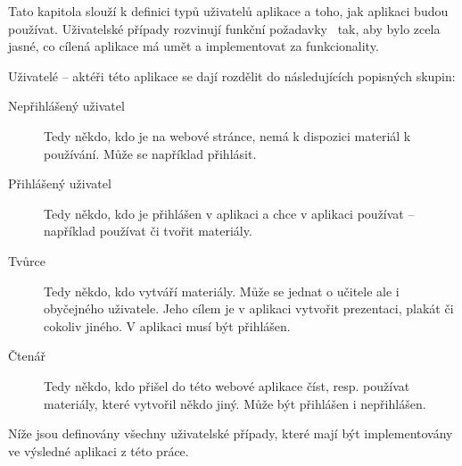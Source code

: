 Tato kapitola slouží k definici typů uživatelů aplikace a toho, jak aplikaci budou používat.
Uživatelské případy rozvinují funkční požadavky~\cite{uml_2007} tak, aby bylo zcela jasné, co cílená aplikace má umět a implementovat za funkcionality.

Uživatelé -- aktéři této aplikace se dají rozdělit do následujících popisných skupin:

\begin{description}
    \item[Nepřihlášený uživatel] Tedy někdo, kdo je na webové stránce, nemá k dispozici materiál k používání. Může se například přihlásit.
    \item[Přihlášený uživatel] Tedy někdo, kdo je přihlášen v aplikaci a chce v aplikaci používat -- například používat či tvořit materiály.
    \item[Tvůrce] Tedy někdo, kdo vytváří materiály. Může se jednat o učitele ale i obyčejného uživatele. Jeho cílem je v aplikaci vytvořit prezentaci, plakát či cokoliv jiného. V aplikaci musí být přihlášen.
    \item[Čtenář] Tedy někdo, kdo přišel do této webové aplikace číst, resp. používat materiály, které vytvořil někdo jiný. Může být přihlášen i nepřihlášen.
\end{description}

Níže jsou definovány všechny uživatelské případy, které mají být implementovány ve výsledné aplikaci z této práce.

